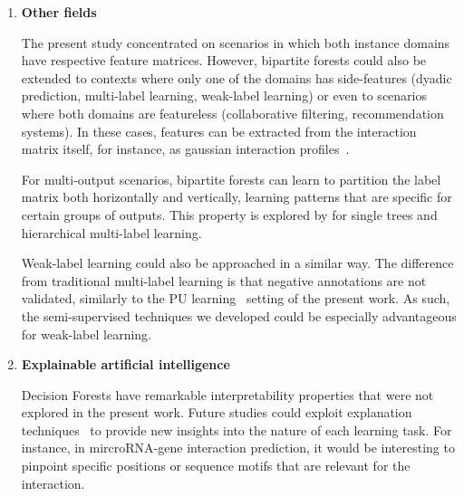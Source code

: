 \begin{enumerate}
    \item \textbf{Other fields}

    The present study concentrated on scenarios in which both instance domains have respective feature matrices. However, bipartite forests could also be extended to contexts where only one of the domains has side-features (dyadic prediction, multi-label learning, weak-label learning) or even to scenarios where both domains are featureless (collaborative filtering, recommendation systems).
    In these cases, features can be extracted from the interaction matrix itself, for instance, as gaussian interaction profiles~\cite{vanlaarhoven2011gaussian}.

    For multi-output scenarios, bipartite forests 
    can learn to partition the label matrix both horizontally and vertically, learning patterns that are specific for certain groups of outputs. This property is explored by \cite{zaminth} for single trees and hierarchical multi-label learning.

    Weak-label learning could also be approached in a similar way. The difference from traditional multi-label learning is that negative annotations are not validated, similarly to the PU learning~\cite{bekker2020learning} setting of the present work. As such, the semi-supervised techniques we developed could be especially advantageous for weak-label learning.

    \item \textbf{Explainable artificial intelligence}

    Decision Forests have remarkable interpretability properties that were not explored in the present work. Future studies could exploit explanation techniques~\cite{mdi, mdi+, treeshap} to provide new insights into the nature of each learning task.
    For instance, in mircroRNA-gene interaction prediction, it would be interesting to pinpoint specific positions or sequence motifs that are relevant for the interaction.
\end{enumerate}
